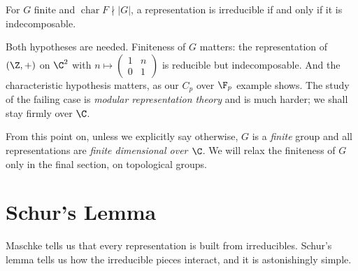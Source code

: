 \begin{corollary}
	For $G$ finite and $\operatorname{char} F \nmid |G|$, a representation is irreducible if and only if it is indecomposable.
\end{corollary}

\begin{remark}
	Both hypotheses are needed. Finiteness of $G$ matters: the representation of $(\Z,+)$ on $\C^2$ with $n \mapsto \left(\begin{smallmatrix}1 & n\\ 0&1\end{smallmatrix}\right)$ is reducible but indecomposable. And the characteristic hypothesis matters, as our $C_p$ over $\F_p$ example shows. The study of the failing case is \emph{modular representation theory} and is much harder; we shall stay firmly over $\C$.
\end{remark}

\begin{remark}
	From this point on, unless we explicitly say otherwise, $G$ is a \emph{finite} group and all representations are \emph{finite dimensional over $\C$}. We will relax the finiteness of $G$ only in the final section, on topological groups.
\end{remark}

\section{Schur's Lemma}

Maschke tells us that every representation is built from irreducibles. Schur's lemma tells us how the irreducible pieces interact, and it is astonishingly simple.

